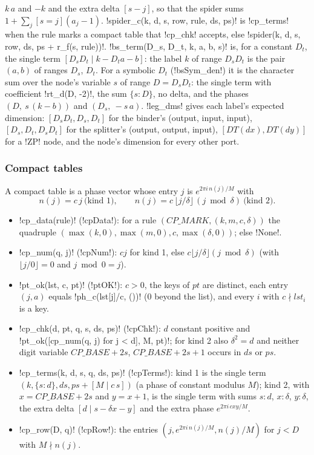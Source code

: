 {{{$k\,a$ and $-k$ and the extra delta $[s - j]$, so that the spider sums $1 + \sum_j [s=j](a_j-1)$.
\lexpy!spider_c(k, d, s, row, rule, ds, ps)! is \lexpy!cp_terms! when the rule marks a compact table
that \lexpy!cp_chk! accepts, else \lexpy!spider(k, d, s, row, ds, ps + r_f(s, rule))!.
\lexpy!bs_term(D_s, D_t, k, a, b, s)! is, for a constant $D_t$, the single term
$[D_sD_t \mid k - D_t a - b]$: the label $k$ of range $D_sD_t$ is the pair $(a, b)$ of ranges
$D_s$, $D_t$. For a symbolic $D_t$ (\lexlean!bsSym_den!) it is the character sum over the node's
variable $s$ of range $D=D_sD_t$: the single term with coefficient \lexpy!rt_d(D, -2)!, the sum $\{s{:}D\}$, no delta, and the phases $(D,\ s\,(k-b))$ and $(D_s,\ -s\,a)$.
\lexpy!leg_dms! gives each label's expected dimension: $[D_sD_t, D_s, D_t]$ for the
binder's (output, input, input), $[D_s, D_t, D_sD_t]$ for the splitter's (output, output,
input), $[\mathit{DT}(dx),\mathit{DT}(dy)]$ for a \lexcode!ZP! node, and the node's dimension for
every other port.

\subsubsection{Compact tables}\label{sec:lean-export-sym-compact}

A compact table is a phase vector whose entry $j$ is $e^{2\pi i\, n(j)/M}$ with
\[
n(j) = c\,j \ \text{(kind 1)},\qquad n(j) = c\,\lfloor j/\delta\rfloor\,(j \bmod \delta)\ \text{(kind 2)}.
\]
\begin{itemize}
\item \lexpy!cp_data(rule)! (\lexlean!cpData!): for a rule $(\mathit{CP\_MARK}, (k, m, c, \delta))$ the
quadruple $(\max(k,0), \max(m,0), c, \max(\delta,0))$; else \lexpy!None!.
\item \lexpy!cp_num(q, j)! (\lexlean!cpNum!): $c j$ for kind 1, else $c\lfloor j/\delta\rfloor(j\bmod
\delta)$ (with $\lfloor j/0\rfloor = 0$ and $j \bmod 0 = j$).
\item \lexpy!pt_ok(lst, c, pt)! (\lexlean!ptOK!): $c>0$, the keys of $pt$ are distinct, each entry
$(j, a)$ equals \lexpy!ph_c(lst[j]/c, ())! ($0$ beyond the list), and every $i$ with $c \nmid
lst_i$ is a key.
\item \lexpy!cp_chk(d, pt, q, s, ds, ps)! (\lexlean!cpChk!): $d$ constant positive and
\lexpy!pt_ok([cp_num(q, j) for j < d], M, pt)!; for kind 2 also $\delta^2 = d$ and neither digit
variable $\mathit{CP\_BASE}+2s$, $\mathit{CP\_BASE}+2s+1$ occurs in $ds$ or $ps$.
\item \lexpy!cp_terms(k, d, s, q, ds, ps)! (\lexlean!cpTerms!): kind 1 is the single term
$(k, \{s{:}d\}, ds, ps + [M \mid c\,s])$ (a phase of constant modulus $M$); kind 2, with
$x = \mathit{CP\_BASE}+2s$ and $y = x+1$, is the single term with sums $s{:}d$, $x{:}\delta$,
$y{:}\delta$, the extra delta $[d \mid s - \delta x - y]$ and the extra phase
$e^{2\pi i\, c x y / M}$.
\item \lexpy!cp_row(D, q)! (\lexlean!cpRow!): the entries $(j, e^{2\pi i\, n(j)/M}, n(j)/M)$ for
$j<D$ with $M \nmid n(j)$.
\end{itemize}

}}}
